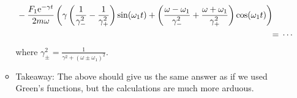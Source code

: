\documentclass[../notes.tex]{subfiles}
\begin{document}
\begin{itemize}
\begin{itemize}
\begin{align*}
\begin{split}
                & -\frac{F_1\e[-\gamma t]}{2m\omega}\left( \gamma\left( \frac{1}{\gamma_-^2}-\frac{1}{\gamma_+^2} \right)\sin(\omega_1t)+\left( \frac{\omega-\omega_1}{\gamma_-^2}+\frac{\omega+\omega_1}{\gamma_+^2} \right)\cos(\omega_1t) \right)
            \end{split}\\
            ={}& \cdots
        \end{align*}
        where $\gamma_\pm^2=\frac{1}{\gamma^2+(\omega\pm\omega_1)^2}$.
        \item Takeaway: The above should give us the same answer as if we used Green's functions, but the calculations are much more arduous.
    \end{itemize}
\end{itemize}
\end{document}
